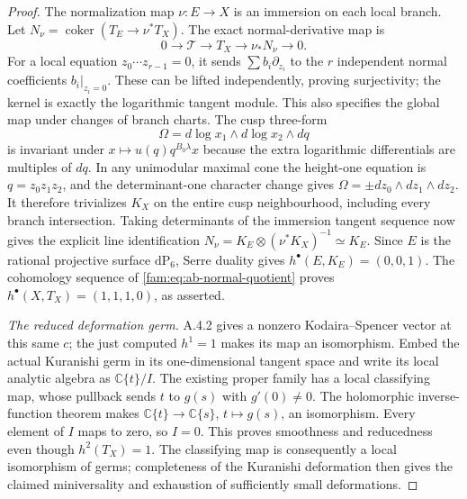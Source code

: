 \begin{proof}
The normalization map $\nu:E\to X$ is an immersion on each local
branch. Let $N_\nu=\operatorname{coker}(T_E\to\nu^*T_X)$.
The exact normal-derivative map is
\begin{equation}\label{fam:eq:ab-normal-quotient}
 0\longrightarrow\mathcal T\longrightarrow T_X
 \longrightarrow\nu_*N_\nu\longrightarrow0.
\end{equation}
For a local equation $z_0\cdots z_{r-1}=0$, it sends
$\sum b_i\partial_{z_i}$ to the $r$ independent normal coefficients
$b_i|_{z_i=0}$. These can be lifted independently, proving
surjectivity; the kernel is exactly the logarithmic tangent module.
This also specifies the global map under changes of branch charts.
The cusp three-form
\[
 \Omega=d\log x_1\wedge d\log x_2\wedge dq
\]
is invariant under $x\mapsto u(q)q^{B_0\lambda}x$ because the
extra logarithmic differentials are multiples of $dq$. In any
unimodular maximal cone the height-one equation is $q=z_0z_1z_2$,
and the determinant-one character change gives
$\Omega=\pm dz_0\wedge dz_1\wedge dz_2$.
It therefore trivializes $K_X$ on the entire cusp neighbourhood,
including every branch intersection. Taking determinants of the
immersion tangent sequence now gives the explicit line identification
$N_\nu=K_E\otimes(\nu^*K_X)^{-1}\simeq K_E$.
Since $E$ is the rational projective surface $\mathrm{dP}_6$,
Serre duality gives $h^\bullet(E,K_E)=(0,0,1)$.
The cohomology sequence of \eqref{fam:eq:ab-normal-quotient} proves
$h^\bullet(X,T_X)=(1,1,1,0)$, as asserted.

\emph{The reduced deformation germ.}
A.4.2 gives a nonzero Kodaira--Spencer vector at this same $c$;
the just computed $h^1=1$ makes its map an isomorphism.
Embed the actual Kuranishi germ in its one-dimensional tangent space
and write its local analytic algebra as $\mathbb C\{t\}/I$.
The existing proper family has a local classifying map, whose pullback
sends $t$ to $g(s)$ with $g'(0)\ne0$. The holomorphic inverse-function
theorem makes $\mathbb C\{t\}\to\mathbb C\{s\}$, $t\mapsto g(s)$,
an isomorphism. Every element of $I$ maps to zero, so $I=0$.
This proves smoothness and reducedness even though $h^2(T_X)=1$.
The classifying map is consequently a local isomorphism of germs;
completeness of the Kuranishi deformation then gives the claimed
miniversality and exhaustion of sufficiently small deformations.
\end{proof}


